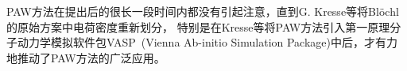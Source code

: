 

%
\textrm{PAW}方法在提出后的很长一段时间内都没有引起注意，直到\textrm{G. Kresse}等\cite{PRB59-1758_1999}将\textrm{Bl\"ochl}的原始方案中电荷密度重新划分，%
特别是在\textrm{Kresse}等将\textrm{PAW}方法引入第一原理分子动力学模拟软件包\textrm{VASP~(Vienna Ab-initio Simulation Package)}\cite{VASP_manual}中后，才有力地推动了\textrm{PAW}方法的广泛应用。

